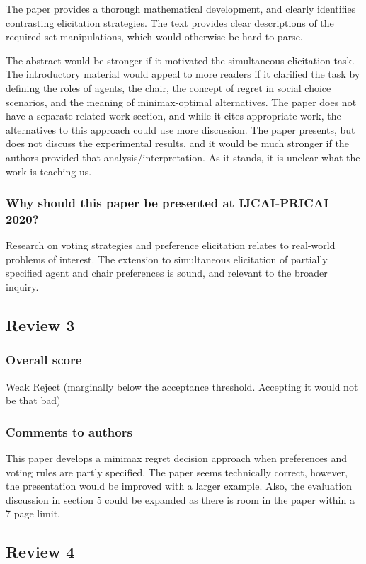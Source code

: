 \documentclass[version=3.21, pagesize, twoside=off, bibliography=totoc, DIV=calc, fontsize=12pt, a4paper]{scrartcl}
\begin{document}
The paper provides a thorough mathematical development, and clearly identifies contrasting elicitation strategies. The text provides clear descriptions of the required set manipulations, which would otherwise be hard to parse.

The abstract would be stronger if it motivated the simultaneous elicitation task. The introductory material would appeal to more readers if it clarified the task by defining the roles of agents, the chair, the concept of regret in social choice scenarios, and the meaning of minimax-optimal alternatives. The paper does not have a separate related work section, and while it cites appropriate work, the alternatives to this approach could use more discussion. The paper presents, but does not discuss the experimental results, and it would be much stronger if the authors provided that analysis/interpretation. As it stands, it is unclear what the work is teaching us.
\subsubsection*{Why should this paper be presented at IJCAI-PRICAI 2020?}
Research on voting strategies and preference elicitation relates to real-world problems of interest. The extension to simultaneous elicitation of partially specified agent and chair preferences is sound, and relevant to the broader inquiry.

\subsection{Review 3}
\subsubsection*{Overall score}
Weak Reject (marginally below the acceptance threshold. Accepting it would not be that bad)
\subsubsection*{Comments to authors}
This paper develops a minimax regret decision approach when preferences and voting rules are partly specified. The paper seems technically correct, however, the presentation would be improved with a larger example. Also, the evaluation discussion in section 5 could be expanded as there is room in the paper within a 7 page limit.

\subsection{Review 4}
\end{document}
